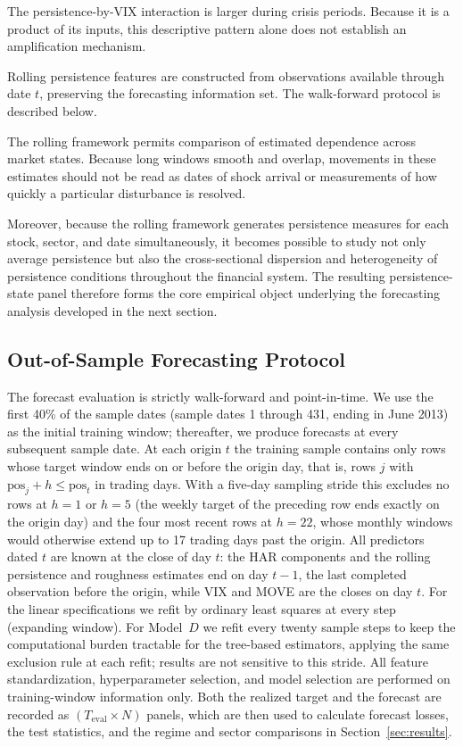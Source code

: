 \documentclass[jrfm,article,submit,moreauthors,pdftex]{Definitions/mdpi}
\begin{document}
The persistence-by-VIX interaction is larger during crisis periods. Because
it is a product of its inputs, this descriptive pattern alone does not
establish an amplification mechanism.

Rolling persistence features are constructed from observations available
through date $t$, preserving the forecasting information set. The
walk-forward protocol is described below.

The rolling framework permits comparison of estimated dependence across
market states. Because long windows smooth and overlap, movements in these
estimates should not be read as dates of shock arrival or measurements of
how quickly a particular disturbance is resolved.

Moreover, because the rolling framework generates persistence measures for
each stock, sector, and date simultaneously, it becomes possible to study
not only average persistence but also the cross-sectional dispersion and
heterogeneity of persistence conditions throughout the financial system.
The resulting persistence-state panel therefore forms the core empirical
object underlying the forecasting analysis developed in the next section.
 

 

\subsection{Out-of-Sample Forecasting Protocol}

The forecast evaluation is strictly walk-forward and point-in-time. We use
the first 40\% of the sample dates (sample dates 1 through 431, ending in
June 2013) as the initial training window; thereafter, we produce forecasts
at every subsequent sample date. At each origin $t$ the training sample
contains only rows whose target window ends on or before the origin day,
that is, rows $j$ with $\mathrm{pos}_j + h \le \mathrm{pos}_t$ in trading
days. With a five-day sampling stride this excludes no rows at $h=1$ or
$h=5$ (the weekly target of the preceding row ends exactly on the origin
day) and the four most recent rows at $h=22$, whose monthly windows would
otherwise extend up to 17 trading days past the origin. All predictors
dated $t$ are known at the close of day $t$: the HAR components and the
rolling persistence and roughness estimates end on day $t-1$, the last
completed observation before the origin, while VIX and MOVE are the closes
on day $t$. For the linear specifications we refit by ordinary least
squares at every step (expanding window). For Model~$D$ we refit every
twenty sample steps to keep the computational burden tractable for the
tree-based estimators, applying the same exclusion rule at each refit;
results are not sensitive to this stride. All feature standardization,
hyperparameter selection, and model selection are performed on
training-window information only. Both the realized target and the
forecast are recorded as $(T_{\mathrm{eval}}\!\times\!N)$ panels, which are
then used to calculate forecast losses, the test statistics, and the regime
and sector comparisons in Section~\ref{sec:results}.
\end{document}
